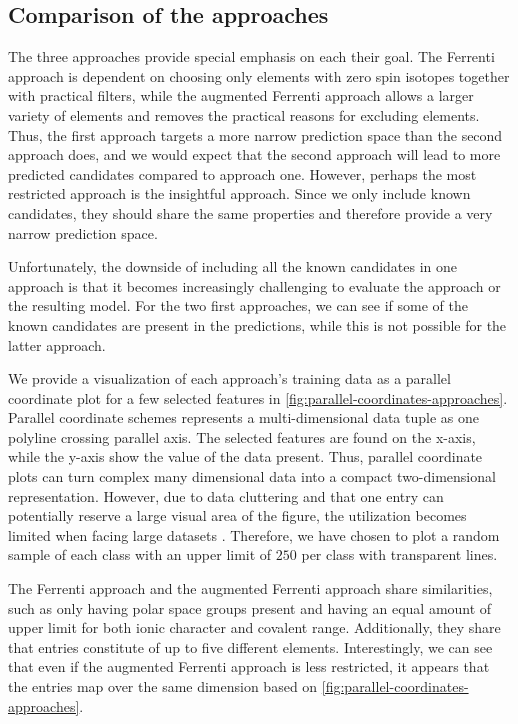 \clearpage


\subsection{Comparison of the approaches}

The three approaches provide special emphasis on each their goal. The Ferrenti approach is dependent on choosing only elements with zero spin isotopes together with practical filters, while the augmented Ferrenti approach allows a larger variety of elements and removes the practical reasons for excluding elements. Thus, the first approach targets a more narrow prediction space than the second approach does, and we would expect that the second approach will lead to more predicted candidates compared to approach one. However, perhaps the most restricted approach is the insightful approach. Since we only include known candidates, they should share the same properties and therefore provide a very narrow prediction space.

Unfortunately, the downside of including all the known candidates in one approach is that it becomes increasingly challenging to evaluate the approach or the resulting model. For the two first approaches, we can see if some of the known candidates are present in the predictions, while this is not possible for the latter approach.

We provide a visualization of each approach's training data as a parallel coordinate plot for a few selected features in \ref{fig:parallel-coordinates-approaches}. Parallel coordinate schemes \cite{Inselberg1985, Inselberga1990} represents a multi-dimensional data tuple as one polyline crossing parallel axis. The selected features are found on the x-axis, while the y-axis show the value of the data present. Thus, parallel coordinate plots can turn complex many dimensional data into a compact two-dimensional representation. However, due to data cluttering and that one entry can potentially reserve a large visual area of the figure, the utilization becomes limited when facing large datasets \cite{Ericsona}. Therefore, we have chosen to plot a random sample of each class with an upper limit of $250$ per class with transparent lines.

The Ferrenti approach and the augmented Ferrenti approach share similarities, such as only having polar space groups present and having an equal amount of upper limit for both ionic character and covalent range. Additionally, they share that entries constitute of up to five different elements. Interestingly, we can see that even if the augmented Ferrenti approach is less restricted, it appears that the entries map over the same dimension based on \ref{fig:parallel-coordinates-approaches}.


